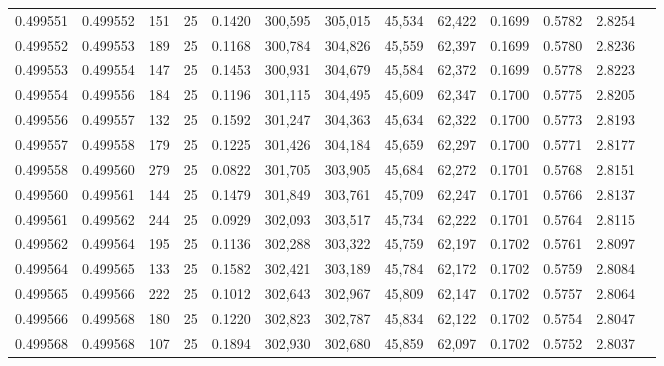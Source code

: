 \begin{tabular}{rrrrrrrrrrrrr}
0.499551 & 0.499552 & 151 &  25 &                                     0.1420 & 300,595 & 305,015 &  45,534 &  62,422 & 0.1699 & 0.5782 & 2.8254 \\
0.499552 & 0.499553 & 189 &  25 &                                     0.1168 & 300,784 & 304,826 &  45,559 &  62,397 & 0.1699 & 0.5780 & 2.8236 \\
0.499553 & 0.499554 & 147 &  25 &                                     0.1453 & 300,931 & 304,679 &  45,584 &  62,372 & 0.1699 & 0.5778 & 2.8223 \\
0.499554 & 0.499556 & 184 &  25 &                                     0.1196 & 301,115 & 304,495 &  45,609 &  62,347 & 0.1700 & 0.5775 & 2.8205 \\
0.499556 & 0.499557 & 132 &  25 &                                     0.1592 & 301,247 & 304,363 &  45,634 &  62,322 & 0.1700 & 0.5773 & 2.8193 \\
0.499557 & 0.499558 & 179 &  25 &                                     0.1225 & 301,426 & 304,184 &  45,659 &  62,297 & 0.1700 & 0.5771 & 2.8177 \\
0.499558 & 0.499560 & 279 &  25 &                                     0.0822 & 301,705 & 303,905 &  45,684 &  62,272 & 0.1701 & 0.5768 & 2.8151 \\
0.499560 & 0.499561 & 144 &  25 &                                     0.1479 & 301,849 & 303,761 &  45,709 &  62,247 & 0.1701 & 0.5766 & 2.8137 \\
0.499561 & 0.499562 & 244 &  25 &                                     0.0929 & 302,093 & 303,517 &  45,734 &  62,222 & 0.1701 & 0.5764 & 2.8115 \\
0.499562 & 0.499564 & 195 &  25 &                                     0.1136 & 302,288 & 303,322 &  45,759 &  62,197 & 0.1702 & 0.5761 & 2.8097 \\
0.499564 & 0.499565 & 133 &  25 &                                     0.1582 & 302,421 & 303,189 &  45,784 &  62,172 & 0.1702 & 0.5759 & 2.8084 \\
0.499565 & 0.499566 & 222 &  25 &                                     0.1012 & 302,643 & 302,967 &  45,809 &  62,147 & 0.1702 & 0.5757 & 2.8064 \\
0.499566 & 0.499568 & 180 &  25 &                                     0.1220 & 302,823 & 302,787 &  45,834 &  62,122 & 0.1702 & 0.5754 & 2.8047 \\
0.499568 & 0.499568 & 107 &  25 &                                     0.1894 & 302,930 & 302,680 &  45,859 &  62,097 & 0.1702 & 0.5752 & 2.8037 \\

\end{tabular}
